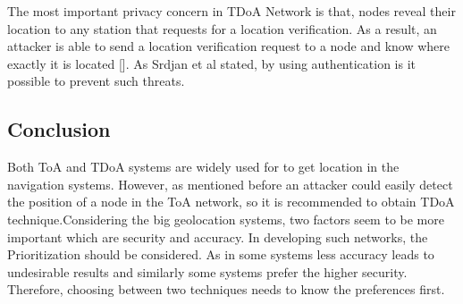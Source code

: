 The most important privacy concern in TDoA Network is that, nodes reveal their location to any station that requests for a location verification. As a result, an attacker is able to send a location verification request to a node and know where exactly it is located []. As Srdjan et al stated, by using authentication is it possible to prevent such threats.

\subsection{Conclusion}
Both ToA and TDoA systems are widely used for to get location in the navigation systems. However, as mentioned before an attacker could easily detect the position of a node in the ToA network, so it is recommended to obtain TDoA technique.Considering the big geolocation systems, two factors seem to be more important which are security and accuracy. In developing such networks, the Prioritization should be considered. As in some systems less accuracy leads to undesirable results and similarly some systems prefer the higher security. Therefore, choosing between two techniques needs to know the preferences first.
